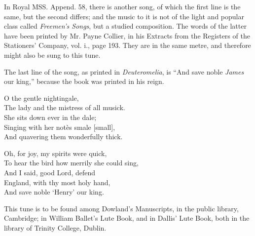In Royal MSS. Append. 58, there is another \pagebreak song, of which the first line is the
same, but the second differs; and the music to it is not of the light and popular
class called \textit{Freemen’s Songs}, but a studied composition. The words of the latter
have been printed by Mr. Payne Collier, in his Extracts from the Registers of
the Stationers’ Company, vol. i., page 193. They are in the same metre, and
therefore might also be sung to this tune.

The last line of the song, as printed in \textit{Deuteromelia}, is “And save noble \textit{James}
our king,” because the book was printed in his reign.


\medskip



\settowidth{\versewidth}{To hear the bird how merrily she could sing,}
\begin{dcverse}\begin{patverse}
\vin O the gentle nightingale,\\
The lady and the mistress of all musick.\\
She sits down ever in the dale;\\
Singing with her notès smale [small],\\
And quavering them wonderfully thick.
\end{patverse}

\begin{patverse}
\vin Oh, for joy, my spirits were quick,\\
To hear the bird how merrily she could sing,\\
And I said, good Lord, defend\\
England, with thy most holy hand,\\
And save noble ‘Henry’ our king.
\end{patverse}
\end{dcverse}


This tune is to be found among Dowland’s Manuscripts, in the public library,
Cambridge; in William Ballet’s Lute Book, and in Dallis’ Lute Book, both in
the library of Trinity College, Dublin.

